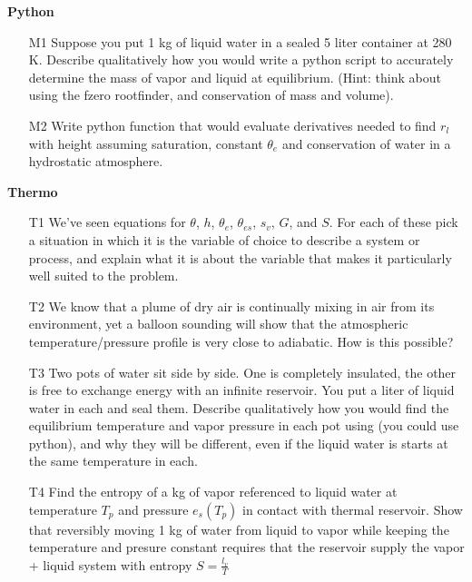 \documentclass[12pt]{article}
\begin{document}
\textbf{Python}

\begin{enumerate}
\item[M1]  Suppose you put 1 kg of liquid water in a sealed 5 liter container 
at 280 K.  Describe qualitatively how you would write a python
script to  accurately determine the mass of vapor and liquid at
equilibrium.  (Hint:  think about using the fzero rootfinder, and
conservation of mass and volume).


\item[M2] Write python function that would evaluate derivatives needed to
find  $r_l$  with height assuming saturation, constant $\theta_e$ and
conservation of water in a hydrostatic atmosphere.


\end{enumerate}

\textbf{Thermo}

\begin{enumerate}
\item[T1]  We've seen equations for $\theta$, $h$, $\theta_e$, $\theta_{es}$, $s_{v}$, $G$,
and $S$.  For each of these pick a situation in which it is the variable of choice to
describe a system or process, and explain what it is about the variable that makes it
particularly well suited to the problem.


\item[T2]  We know that a plume of dry air is continually mixing in air from its environment,
yet a balloon sounding will show that the atmospheric temperature/pressure profile is very close
to adiabatic.  How is this possible?

\item[T3]  Two pots of water sit side by side.  One is completely
insulated, the other is free to exchange energy with an
infinite reservoir.  You put a liter of liquid water in each and
seal them.   Describe qualitatively how you would find the
equilibrium temperature and vapor pressure in each pot using
(you could use python), and why they will be different, even if
the liquid water is starts at the same temperature in each.


\item[T4] Find the entropy of a kg of vapor
referenced to liquid water  at temperature $T_p$ and pressure $e_s(T_p)$ in
contact with thermal reservoir.  Show that reversibly moving 1 kg
of water from liquid to vapor while keeping the temperature
and presure constant requires that the reservoir supply
the vapor + liquid system with entropy $S=\frac{ l_v}{T}$



\end{enumerate}
\end{document}

